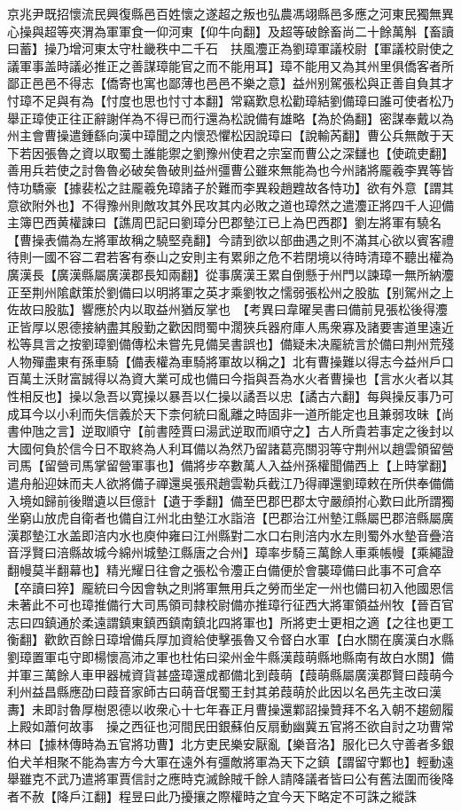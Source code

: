 京兆尹既招懷流民興復縣邑百姓懷之遂超之叛也弘農馮翊縣邑多應之河東民獨無異心操與超等夾渭為軍軍食一仰河東【仰牛向翻】及超等破餘畜尚二十餘萬斛【畜讀曰蓄】操乃增河東太守杜畿秩中二千石　扶風灋正為劉璋軍議校尉【軍議校尉使之議軍事盖時議必推正之善謀璋能官之而不能用耳】璋不能用又為其州里俱僑客者所鄙正邑邑不得志【僑寄也寓也鄙薄也邑邑不樂之意】益州别駕張松與正善自負其才忖璋不足與有為【忖度也思也忖寸本翻】常竊歎息松勸璋結劉備璋曰誰可使者松乃舉正璋使正往正辭謝佯為不得已而行還為松說備有雄略【為於偽翻】密謀奉戴以為州主會曹操遣鍾繇向漢中璋聞之内懷恐懼松因說璋曰【說輸芮翻】曹公兵無敵于天下若因張魯之資以取蜀土誰能禦之劉豫州使君之宗室而曹公之深讎也【使疏吏翻】善用兵若使之討魯魯必破矣魯破則益州彊曹公雖來無能為也今州諸將龎羲李異等皆恃功驕豪【據裴松之註龎羲免璋諸子於難而李異殺趙韙故各恃功】欲有外意【謂其意欲附外也】不得豫州則敵攻其外民攻其内必敗之道也璋然之遣灋正將四千人迎備主簿巴西黄權諫曰【譙周巴記曰劉璋分巴郡墊江已上為巴西郡】劉左將軍有驍名【曹操表備為左將軍故稱之驍堅堯翻】今請到欲以部曲遇之則不滿其心欲以賓客禮待則一國不容二君若客有泰山之安則主有累卵之危不若閉境以待時清璋不聽出權為廣漢長【廣漢縣屬廣漢郡長知兩翻】從事廣漢王累自倒懸于州門以諫璋一無所納灋正至荆州隂獻策於劉備曰以明將軍之英才乘劉牧之懦弱張松州之股肱【别駕州之上佐故曰股肱】響應於内以取益州猶反掌也　【考異曰韋曜吴書曰備前見張松後得灋正皆厚以恩德接納盡其殷勤之歡因問蜀中濶狹兵器府庫人馬衆寡及諸要害道里遠近松等具言之按劉璋劉備傳松未嘗先見備吴書誤也】備疑未决龎統言於備曰荆州荒殘人物殫盡東有孫車騎【備表權為車騎將軍故以稱之】北有曹操難以得志今益州戶口百萬土沃財富誠得以為資大業可成也備曰今指與吾為水火者曹操也【言水火者以其性相反也】操以急吾以寛操以暴吾以仁操以譎吾以忠【譎古六翻】每與操反事乃可成耳今以小利而失信義於天下柰何統曰亂離之時固非一道所能定也且兼弱攻昧【尚書仲虺之言】逆取順守【前書陸賈曰湯武逆取而順守之】古人所貴若事定之後封以大國何負於信今日不取終為人利耳備以為然乃留諸葛亮關羽等守荆州以趙雲領留營司馬【留營司馬掌留營軍事也】備將步卒數萬人入益州孫權聞備西上【上時掌翻】遣舟船迎妹而夫人欲將備子禪還吳張飛趙雲勒兵截江乃得禪還劉璋敕在所供奉備備入境如歸前後贈遺以巨億計【遺于季翻】備至巴郡巴郡太守嚴顔拊心歎曰此所謂獨坐窮山放虎自衛者也備自江州北由墊江水詣涪【巴郡治江州墊江縣屬巴郡涪縣屬廣漢郡墊江水盖即涪内水也庾仲雍曰江州縣對二水口右則涪内水左則蜀外水墊音疊涪音浮賢曰涪縣故城今綿州城墊江縣唐之合州】璋率步騎三萬餘人車乘帳幔【乘繩證翻幔莫半翻幕也】精光耀日往會之張松令灋正白備便於會襲璋備曰此事不可倉卒【卒讀曰猝】龎統曰今因會執之則將軍無用兵之勞而坐定一州也備曰初入他國恩信未著此不可也璋推備行大司馬領司隸校尉備亦推璋行征西大將軍領益州牧【晉百官志曰四鎮通於柔遠謂鎮東鎮西鎮南鎮北四將軍也】所將吏士更相之適【之往也更工衡翻】歡飲百餘日璋增備兵厚加資給使擊張魯又令督白水軍【白水關在廣漢白水縣劉璋置軍屯守即楊懷高沛之軍也杜佑曰梁州金牛縣漢葭萌縣地縣南有故白水關】備并軍三萬餘人車甲器械資貨甚盛璋還成都備北到葭萌【葭萌縣屬廣漢郡賢曰葭萌今利州益昌縣應劭曰葭音家師古曰萌音氓蜀王封其弟葭萌於此因以名邑先主改曰漢夀】未即討魯厚樹恩德以收衆心十七年春正月曹操還鄴詔操贊拜不名入朝不趨劒履上殿如蕭何故事　操之西征也河間民田銀蘇伯反扇動幽冀五官將丕欲自討之功曹常林曰【據林傳時為五官將功曹】北方吏民樂安厭亂【樂音洛】服化已久守善者多銀伯犬羊相聚不能為害方今大軍在遠外有彊敵將軍為天下之鎮【謂留守鄴也】輕動遠舉雖克不武乃遣將軍賈信討之應時克滅餘賊千餘人請降議者皆曰公有舊法圍而後降者不赦【降戶江翻】程昱曰此乃擾攘之際權時之宜今天下略定不可誅之縱誅